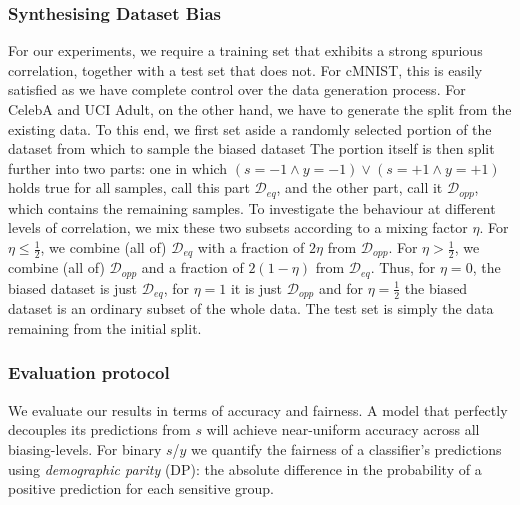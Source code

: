 \subsubsection{Synthesising Dataset Bias}
For our experiments, we require a training set that exhibits a strong spurious correlation, together with a test set that does not.
For cMNIST, this is easily satisfied as we have complete control over the data generation process.
For CelebA and  UCI Adult, on the other hand,
we have to generate the split from the existing data.
To this end, we first set aside a randomly selected portion of the dataset from which to sample the biased dataset
The portion itself is then split further into two parts:
one in which $(s=-1 \land y=-1) \lor (s=+1 \land y=+1)$ holds true for all samples, call this part $\mathcal{D}_{eq}$,
and the other part, call it $\mathcal{D}_{opp}$, which contains the remaining samples.
To investigate the behaviour at different levels of correlation,
we mix these two subsets according to a mixing factor $\eta$.
For $\eta \leq \tfrac{1}{2}$, we combine (all of) $\mathcal{D}_{eq}$
with a fraction of $2\eta$ from $\mathcal{D}_{opp}$.
For $\eta > \tfrac{1}{2}$, we combine (all of) $\mathcal{D}_{opp}$
and a fraction of $2(1 -\eta)$ from $\mathcal{D}_{eq}$.
Thus, for $\eta=0$, the biased dataset is just $\mathcal{D}_{eq}$,
for $\eta=1$ it is just $\mathcal{D}_{opp}$
and for $\eta=\tfrac{1}{2}$ the biased dataset is an ordinary subset of the whole data. The test set is simply the data remaining from the initial split.

\subsubsection{Evaluation protocol}
We evaluate our results in terms of accuracy and fairness.
A model that perfectly decouples its predictions from $s$ will achieve near-uniform accuracy across all biasing-levels.
For binary $s$/$y$ we quantify the fairness of a classifier's predictions using \emph{demographic parity} (DP): the  absolute difference in the probability  of a positive prediction for each sensitive group.


